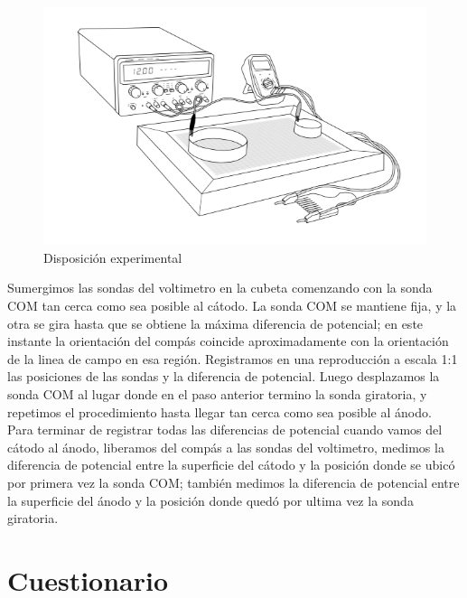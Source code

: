 \documentclass[DIV=calc, paper=a4, fontsize=11pt, twocolumn, spanish]{scrartcl}	 %
\begin{document}
\begin{figure}[htbp]
\centering
	\includegraphics[scale=0.8]{data/img/experiment}
	\caption{Disposición experimental}
\end{figure}

Sumergimos las sondas del voltimetro en la cubeta comenzando con la sonda COM tan cerca como sea posible al cátodo. La sonda COM se mantiene fija, y la otra se gira hasta que se obtiene la máxima diferencia de potencial; en este instante la orientación del compás coincide aproximadamente con la orientación de la linea de campo en esa región. Registramos en una reproducción a escala 1:1 las posiciones de las sondas y la diferencia de potencial. Luego desplazamos la sonda COM al lugar donde en el paso anterior termino la sonda giratoria, y repetimos el procedimiento hasta llegar tan cerca como sea posible al ánodo.\\

Para terminar de registrar todas las diferencias de potencial cuando vamos del cátodo al ánodo, liberamos del compás a las sondas del voltimetro, medimos la diferencia de potencial entre la superficie del cátodo y la posición donde se ubicó por primera vez la sonda COM; también medimos la diferencia de potencial entre la superficie del ánodo y la posición donde quedó por ultima vez la sonda giratoria.

\section*{Cuestionario}
\end{document}
